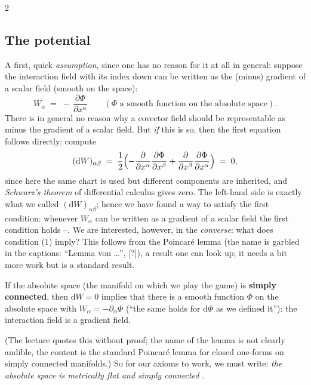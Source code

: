 \begin{paracol}{2}
\subsection{The potential}\label{ssec:ng-potential}

A first, quick \emph{assumption}, since one has no reason for it at all in general: suppose the interaction field with its index down can be written as the (minus) gradient of a scalar field (smooth on the space):
\begin{equation}\label{eq:ng-potential}
  W_\alpha\;=\;-\,\frac{\partial\Phi}{\partial x^\alpha}\qquad(\Phi\text{ a smooth function on the absolute space}).
\end{equation}
There is in general no reason why a covector field should be representable as minus the gradient of a scalar field. But \emph{if} this is so, then the first equation follows directly: compute
\begin{equation}\label{eq:ng-schwarz}
  (\mathrm dW)_{\alpha\beta}\;=\;\frac12\Bigl(-\frac{\partial}{\partial x^\alpha}\frac{\partial\Phi}{\partial x^\beta}+\frac{\partial}{\partial x^\beta}\frac{\partial\Phi}{\partial x^\alpha}\Bigr)\;=\;0 ,
\end{equation}
since here the same chart is used but different components are inherited, and \emph{Schwarz's theorem} of differential calculus gives zero. The left-hand side is exactly what we called $(\mathrm dW)_{\alpha\beta}$; hence we have found a way to satisfy the first condition: whenever $W_\alpha$ can be written as a gradient of a scalar field the first condition holds --.
We are interested, however, in the \emph{converse}: what does condition (1) imply? This follows from the Poincar\'e lemma (the name is garbled in the captions: ``Lemma von \dots'', [?]), a result one can look up; it needs a bit more work but is a standard result.

\begin{theorem}\label{thm:ng-poincare}
If the absolute space (the manifold on which we play the game) is \textbf{simply connected}, then $\mathrm dW=0$ implies that there is a smooth function $\Phi$ on the absolute space with $W_\alpha=-\partial_\alpha\Phi$ (``the same holds for $\mathrm d\Phi$ as we defined it''): the interaction field is a gradient field.
\end{theorem}
(The lecture quotes this without proof; the name of the lemma is not clearly audible, the content is the standard Poincar\'e lemma for closed one-forms on simply connected manifolds.) So for our axioms to work, we must write: \emph{the absolute space is metrically flat and simply connected} .


\end{paracol}
